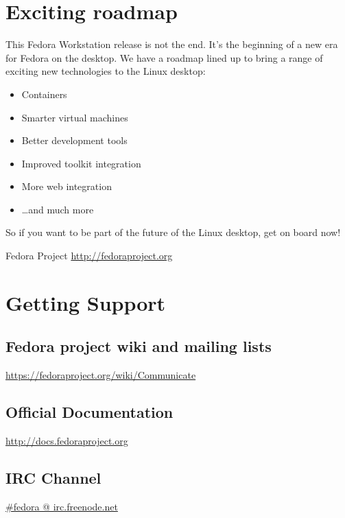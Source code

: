\documentclass[
10pt
]{leaflet}
\begin{document}
\section{\textcolor{FedoraBlue}{Exciting roadmap}}
This Fedora Workstation release is not the end. It's the beginning of a new era for Fedora on the desktop. We have a roadmap lined up to bring a range of exciting new technologies to the Linux desktop:
\begin{itemize}
  \item Containers
  \item Smarter virtual machines
  \item Better development tools
  \item Improved toolkit integration
  \item More web integration
  \item \ldots and much more
\end{itemize}

So if you want to be part of the future of the Linux desktop, get on board now!
\newpage

\begin{center}
  {\color{FedoraBlue}
  \LARGE{Fedora Project\vspace{1cm}}
  \Large{\href{http://fedoraproject.org}{http://fedoraproject.org}}
}
\end{center}

\section{\textcolor{FedoraBlue}{Getting Support}}
\subsection{Fedora project wiki and mailing lists}
\href{https://fedoraproject.org/wiki/Communicate}{https://fedoraproject.org/wiki/Communicate}

\subsection{Official Documentation}
\href{http://docs.fedoraproject.org}{http://docs.fedoraproject.org}

\subsection{IRC Channel}
\href{http://webchat.freenode.net/?channels=#fedora}{\#fedora @ irc.freenode.net}
\end{document}
